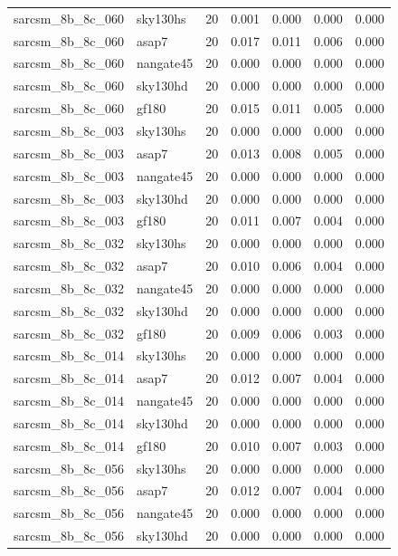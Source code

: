 \begin{tabular}{llrrrrr}
sarcsm\_8b\_8c\_060 & sky130hs & 20 & 0.001 & 0.000 & 0.000 & 0.000 \\
sarcsm\_8b\_8c\_060 & asap7 & 20 & 0.017 & 0.011 & 0.006 & 0.000 \\
sarcsm\_8b\_8c\_060 & nangate45 & 20 & 0.000 & 0.000 & 0.000 & 0.000 \\
sarcsm\_8b\_8c\_060 & sky130hd & 20 & 0.000 & 0.000 & 0.000 & 0.000 \\
sarcsm\_8b\_8c\_060 & gf180 & 20 & 0.015 & 0.011 & 0.005 & 0.000 \\
sarcsm\_8b\_8c\_003 & sky130hs & 20 & 0.000 & 0.000 & 0.000 & 0.000 \\
sarcsm\_8b\_8c\_003 & asap7 & 20 & 0.013 & 0.008 & 0.005 & 0.000 \\
sarcsm\_8b\_8c\_003 & nangate45 & 20 & 0.000 & 0.000 & 0.000 & 0.000 \\
sarcsm\_8b\_8c\_003 & sky130hd & 20 & 0.000 & 0.000 & 0.000 & 0.000 \\
sarcsm\_8b\_8c\_003 & gf180 & 20 & 0.011 & 0.007 & 0.004 & 0.000 \\
sarcsm\_8b\_8c\_032 & sky130hs & 20 & 0.000 & 0.000 & 0.000 & 0.000 \\
sarcsm\_8b\_8c\_032 & asap7 & 20 & 0.010 & 0.006 & 0.004 & 0.000 \\
sarcsm\_8b\_8c\_032 & nangate45 & 20 & 0.000 & 0.000 & 0.000 & 0.000 \\
sarcsm\_8b\_8c\_032 & sky130hd & 20 & 0.000 & 0.000 & 0.000 & 0.000 \\
sarcsm\_8b\_8c\_032 & gf180 & 20 & 0.009 & 0.006 & 0.003 & 0.000 \\
sarcsm\_8b\_8c\_014 & sky130hs & 20 & 0.000 & 0.000 & 0.000 & 0.000 \\
sarcsm\_8b\_8c\_014 & asap7 & 20 & 0.012 & 0.007 & 0.004 & 0.000 \\
sarcsm\_8b\_8c\_014 & nangate45 & 20 & 0.000 & 0.000 & 0.000 & 0.000 \\
sarcsm\_8b\_8c\_014 & sky130hd & 20 & 0.000 & 0.000 & 0.000 & 0.000 \\
sarcsm\_8b\_8c\_014 & gf180 & 20 & 0.010 & 0.007 & 0.003 & 0.000 \\
sarcsm\_8b\_8c\_056 & sky130hs & 20 & 0.000 & 0.000 & 0.000 & 0.000 \\
sarcsm\_8b\_8c\_056 & asap7 & 20 & 0.012 & 0.007 & 0.004 & 0.000 \\
sarcsm\_8b\_8c\_056 & nangate45 & 20 & 0.000 & 0.000 & 0.000 & 0.000 \\
sarcsm\_8b\_8c\_056 & sky130hd & 20 & 0.000 & 0.000 & 0.000 & 0.000 \\

\end{tabular}
